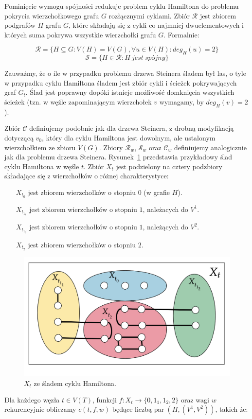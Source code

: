 \documentclass[12pt, oneside]{report}
\begin{document}
Pominięcie wymogu spójności redukuje problem cyklu Hamiltona do problemu pokrycia wierzchołkowego grafu $G$ rozłącznymi cyklami. Zbiór $\mathcal{R}$ jest zbiorem podgrafów $H$ grafu $G$, które składają się z cykli co najmniej dwuelementowych i których suma pokrywa wszystkie wierzchołki grafu $G$. Formalnie:

$$\mathcal{R} = \{H \subseteq G: V(H) = V(G), \forall u \in V(H): deg_H(u) = 2\}$$
$$\mathcal{S} = \{H \in \mathcal{R}: H\ jest\ sp\mbox{ó}jny\}$$

Zauważmy, że o ile w przypadku problemu drzewa Steinera śladem był las, o tyle w przypadku cyklu Hamiltona śladem jest zbiór cykli i ścieżek pokrywających graf $G_t$. Ślad jest poprawny dopóki istnieje możliwość domknięcia wszystkich ścieżek (tzn. w węźle zapominającym wierzchołek $v$ wymagamy, by $deg_H(v) = 2$).

Zbiór $\mathcal{C}$ definiujemy podobnie jak dla drzewa Steinera, z drobną modyfikacją dotyczącą $v_0$, który dla cyklu Hamiltona jest dowolnym, ale ustalonym wierzchołkiem ze zbioru $V(G)$. Zbiory $\mathcal{R}_w$, $\mathcal{S}_w$ oraz $\mathcal{C}_w$ definiujemy analogicznie jak dla problemu drzewa Steinera. Rysunek~\ref{cnc_hamiltonian} przedstawia przykładowy ślad cyklu Hamiltona w węźle $t$. Zbiór $X_t$ jest podzielony na cztery podzbiory składające się z wierzchołków o różnej charakterystyce:
\addtolength{\leftmargini}{3cm}
\begin{itemize}[noitemsep,topsep=5pt,parsep=0pt,partopsep=0pt]
\item[$X_{t_0}$ ] jest zbiorem wierzchołków o stopniu $0$ (w grafie $H$).
\item[$X_{t_{1_1}}$] jest zbiorem wierzchołków o stopniu $1$, należacych do $V^1$.
\item[$X_{t_{1_2}}$] jest zbiorem wierzchołków o stopniu $1$, należących do $V^2$.
\item[$X_{t_2}$ ] jest zbiorem wierzchołków o stopniu $2$.
\end{itemize}
\addtolength{\leftmargini}{-3cm}
\begin{figure}
\centering
\includegraphics[width=16cm]{cnc_hamiltonian.png}
\caption{$X_t$ ze śladem cyklu Hamiltona.}
\label{cnc_hamiltonian}
\end{figure}
\noindent Dla każdego węzła $t \in V(T)$, funkcji $f: X_t \to \{0,1_1,1_2,2\}$ oraz wagi $w$ rekurencyjnie obliczamy $c(t,f,w)$ będące liczbą par $(H, (V^1, V^2))$, takich że:
\end{document}
